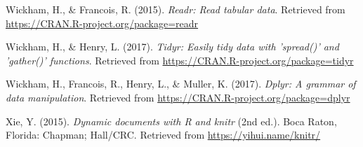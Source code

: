\documentclass[english,man]{apa6}
\theoremstyle{definition}
\theoremstyle{definition}
\theoremstyle{definition}
\theoremstyle{remark}
\begin{document}
\hypertarget{ref-R-readr}{}
Wickham, H., \& Francois, R. (2015). \emph{Readr: Read tabular data}.
Retrieved from \url{https://CRAN.R-project.org/package=readr}

\hypertarget{ref-R-tidyr}{}
Wickham, H., \& Henry, L. (2017). \emph{Tidyr: Easily tidy data with
'spread()' and 'gather()' functions}. Retrieved from
\url{https://CRAN.R-project.org/package=tidyr}

\hypertarget{ref-R-dplyr}{}
Wickham, H., Francois, R., Henry, L., \& Muller, K. (2017). \emph{Dplyr:
A grammar of data manipulation}. Retrieved from
\url{https://CRAN.R-project.org/package=dplyr}

\hypertarget{ref-R-knitr}{}
Xie, Y. (2015). \emph{Dynamic documents with R and knitr} (2nd ed.).
Boca Raton, Florida: Chapman; Hall/CRC. Retrieved from
\url{https://yihui.name/knitr/}
\end{document}
